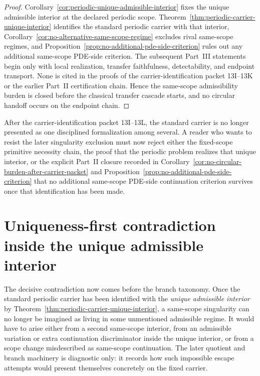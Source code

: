\begin{proof}
Corollary~\ref{cor:periodic-unique-admissible-interior} fixes the unique admissible interior at the declared periodic scope. Theorem~\ref{thm:periodic-carrier-unique-interior} identifies the standard periodic carrier with that interior, Corollary~\ref{cor:no-alternative-same-scope-regime} excludes rival same-scope regimes, and Proposition~\ref{prop:no-additional-pde-side-criterion} rules out any additional same-scope PDE-side criterion. The subsequent Part~III statements begin only with local realization, transfer faithfulness, detectability, and endpoint transport. None is cited in the proofs of the carrier-identification packet 13I--13K or the earlier Part~II certification chain. Hence the same-scope admissibility burden is closed before the classical transfer cascade starts, and no circular handoff occurs on the endpoint chain.
\end{proof}

\begin{remark}
After the carrier-identification packet 13I--13L, the standard carrier is no longer presented as one
disciplined formalization among several. A reader who wants to resist the later singularity
exclusion must now reject either the fixed-scope primitive necessity chain, the proof that the
periodic problem realizes that unique interior, or the explicit Part~II closure recorded in Corollary~\ref{cor:no-circular-burden-after-carrier-packet}
and Proposition~\ref{prop:no-additional-pde-side-criterion} that no additional same-scope PDE-side continuation criterion survives once that identification has
been made.
\end{remark}


\section{Uniqueness-first contradiction inside the unique admissible interior}\label{sec:uniqueness-first-endgame}
The decisive contradiction now comes before the branch taxonomy. Once the standard periodic carrier has been identified with the \emph{unique admissible interior} by Theorem~\ref{thm:periodic-carrier-unique-interior}, a same-scope singularity can no longer be imagined as living in some unmentioned admissible regime. It would have to arise either from a second same-scope interior, from an admissible variation or extra continuation discriminator inside the unique interior, or from a scope change misdescribed as same-scope continuation. The later quotient and branch machinery is diagnostic only: it records how such impossible escape attempts would present themselves concretely on the fixed carrier.

